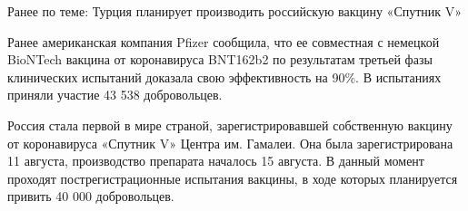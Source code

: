 Ранее по теме: Турция планирует производить российскую вакцину «Спутник V»

Ранее американская компания Pfizer сообщила, что ее совместная с немецкой
BioNTech вакцина от коронавируса BNT162b2 по результатам третьей фазы
клинических испытаний доказала свою эффективность на 90\%. В испытаниях приняли
участие 43 538 добровольцев.

Россия стала первой в мире страной, зарегистрировавшей собственную вакцину от
коронавируса «Спутник V» Центра им. Гамалеи. Она была зарегистрирована 11
августа, производство препарата началось 15 августа. В данный момент проходят
пострегистрационные испытания вакцины, в ходе которых планируется привить 40
000 добровольцев.


